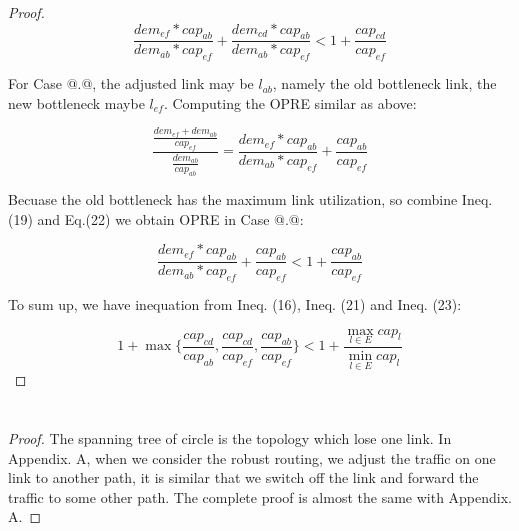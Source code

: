 \documentclass[conference]{IEEEtran}
\makeatletter
\newcommand{\Rmnum}[1]{\expandafter\@slowromancap\romannumeral #1@}
\makeatother
\begin{document}
\begin{proof}
\begin{equation}
\frac {dem_{ef} * cap_{ab}}{dem_{ab} * cap_{ef}} + \frac {dem_{cd} * cap_{ab}}{dem_{ab} * cap_{ef}} 
< 1 + \frac {cap_{cd}}{cap_{ef}}
\end{equation}

For Case \Rmnum{2}.\Rmnum{1}, the adjusted link may be $l_{ab}$, namely the old bottleneck link, the new bottleneck
maybe $l_{ef}$. Computing the OPRE similar as above:

\begin{equation}
\frac {\frac{dem_{ef} + dem_{ab}}{cap_{ef}}} {\frac{dem_{ab}}{cap_{ab}}} = 
\frac {dem_{ef} * cap_{ab}}{dem_{ab} * cap_{ef}} + \frac{cap_{ab}}{cap_{ef}} 
\end{equation}

Becuase the old bottleneck has the maximum link utilization, so combine Ineq. (19) and Eq.(22) we obtain OPRE in Case 
\Rmnum{2}.\Rmnum{1}:

\begin{equation}
\frac {dem_{ef} * cap_{ab}}{dem_{ab} * cap_{ef}} + \frac{cap_{ab}}{cap_{ef}} < 1 + \frac{cap_{ab}}{cap_{ef}}
\end{equation}


To sum up, we have inequation from Ineq. (16), Ineq. (21) and Ineq. (23):

\begin{equation}
1 + \max \{\frac{cap_{cd}}{cap_{ab}}, \frac{cap_{cd}}{cap_{ef}}, \frac{cap_{ab}}{cap_{ef}} \} < 1 + \frac{\max_{l \in E} cap_{l}}{\min_{l \in E} cap_{l}}
\end{equation}

\end{proof}

\section{}
\begin{proof}
The spanning tree of circle is the topology which lose one link. In Appendix. A, when we consider the robust routing, we adjust the traffic 
on one link to another path, it is similar that we switch off the link and forward the traffic to some other path. The complete proof is 
almost the same with Appendix. A.
\end{proof}
\end{document}
